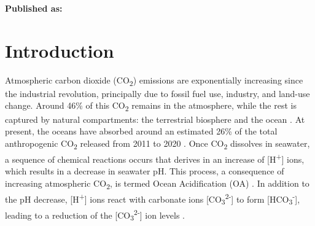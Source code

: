 \vspace{3cm}





\textbf{Published as:}

\vspace{0.5cm}


\newpage
\section{Introduction}

Atmospheric carbon dioxide (CO\textsubscript{2}) emissions are
exponentially increasing since the industrial revolution, principally due to
fossil fuel use, industry, and land-use change. Around 46\% of this
CO\textsubscript{2} remains in the atmosphere, while the rest is captured by
natural compartments: the terrestrial biosphere and the ocean
\cite{Friedlingstein2021}.  At present, the oceans have absorbed around
an estimated 26\% of the total anthropogenic CO\textsubscript{2} released from
2011 to 2020 \cite{Friedlingstein2021}. Once CO\textsubscript{2} dissolves in
seawater, a sequence of chemical reactions occurs that derives in an increase
of [H\textsuperscript{+}] ions, which results in a decrease in seawater pH.
This process, a consequence of increasing atmospheric CO\textsubscript{2}, is
termed Ocean Acidification (OA) \cite{caldeira2003anthropogenic}. In addition
to the pH decrease, [H\textsuperscript{+}] ions react with carbonate ions
    [CO\textsubscript{3}\textsuperscript{2-}] to form
    [HCO\textsubscript{3}\textsuperscript{-}], leading to a reduction of the
    [CO\textsubscript{3}\textsuperscript{2-}] ion levels \cite{doney2009ocean}.


